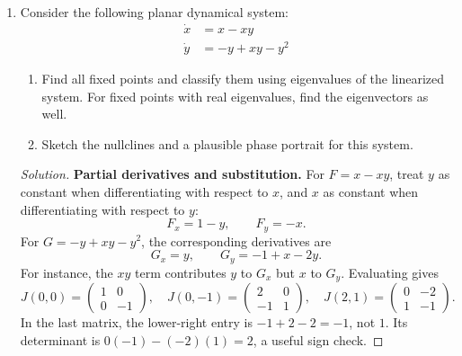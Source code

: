 \documentclass[10pt]{amsart}
\newenvironment{solution}
{\begin{proof}[Solution]}
{\end{proof}}
\begin{document}
\begin{enumerate}[label=\arabic*), leftmargin=*, itemsep=1em]
\begin{solution}
\begin{center}
\quad\qedhere\end{center}
    \end{solution}

    \item Consider the following planar dynamical system:
    \[
        \begin{aligned}
            \dot{x} &= x-xy \\
            \dot{y} &= -y+xy-y^2
        \end{aligned}
    \]
    \begin{enumerate}[label=(\alph*)]
        \item Find all fixed points and classify them using eigenvalues of the linearized system. For fixed points with real eigenvalues, find the eigenvectors as well.
        \item Sketch the nullclines and a plausible phase portrait for this system.
    \end{enumerate}

    \begin{solution}

\noindent\textbf{Partial derivatives and substitution.} For $F=x-xy$, treat $y$ as constant when differentiating with respect to $x$, and $x$ as constant when differentiating with respect to $y$:
\[
F_x=1-y,\qquad F_y=-x.
\]
For $G=-y+xy-y^2$, the corresponding derivatives are
\[
G_x=y,\qquad G_y=-1+x-2y.
\]
For instance, the $xy$ term contributes $y$ to $G_x$ but $x$ to $G_y$. Evaluating gives
\[
J(0,0)=\begin{pmatrix}1&0\\0&-1\end{pmatrix},\quad
J(0,-1)=\begin{pmatrix}2&0\\-1&1\end{pmatrix},\quad
J(2,1)=\begin{pmatrix}0&-2\\1&-1\end{pmatrix}.
\]
In the last matrix, the lower-right entry is $-1+2-2=-1$, not $1$. Its determinant is $0(-1)-(-2)(1)=2$, a useful sign check.


\end{solution}
\end{enumerate}
\end{document}
